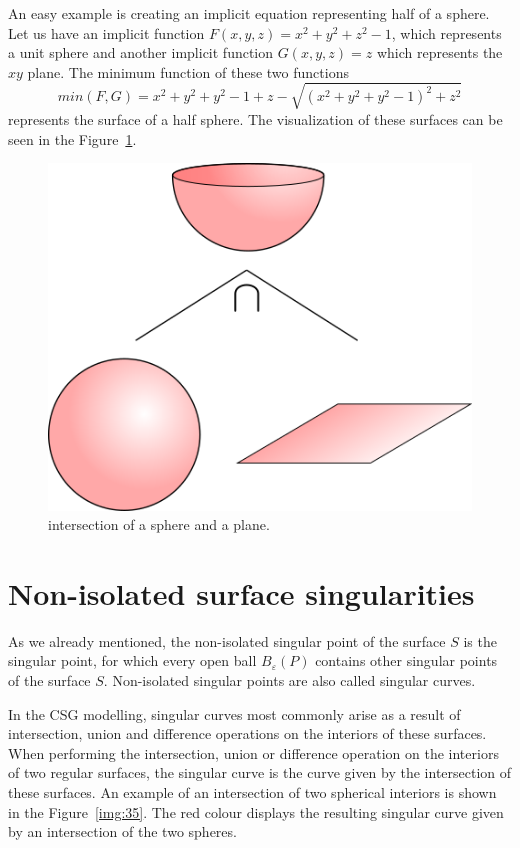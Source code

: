 An easy example is creating an implicit equation representing half of
a sphere. Let us have an implicit function 
$F(x, y, z) = x^2+y^2+z^2-1$, which represents a unit sphere and another
implicit function $G(x, y, z) = z$ which represents the $xy$ plane.
The minimum function of these two functions
$$min(F, G) = x^2+y^2+y^2-1+z-\sqrt{(x^2+y^2+y^2-1)^2+z^2}$$ represents the
surface of a half sphere. The visualization of these surfaces can be seen in
the Figure~\ref{img:20}.
\begin{figure}
    \centerline{\includegraphics[scale=0.5]{images/img20}}
    \caption[Intersection of a sphere and a plane]
    {intersection of a sphere and a plane.}
    \label{img:20}
\end{figure}


\section{Non-isolated surface singularities}
\label{sub2.3}

As we already mentioned, the non-isolated singular point of the surface $S$ is 
the singular point, for which
every open ball $B_\varepsilon(P)$ contains other singular points of the surface $S$.
Non-isolated singular points are also called singular curves.

In the CSG modelling, singular curves most commonly arise as a result of intersection,
union and difference operations on the interiors of these surfaces. When performing
the intersection, union or difference operation on the interiors of two regular surfaces, 
the singular curve is the curve given by the intersection of these surfaces. An example
of an intersection of two spherical interiors is shown in the Figure~\ref{img:35}. The red colour displays the resulting singular curve given by an intersection of the two spheres.

